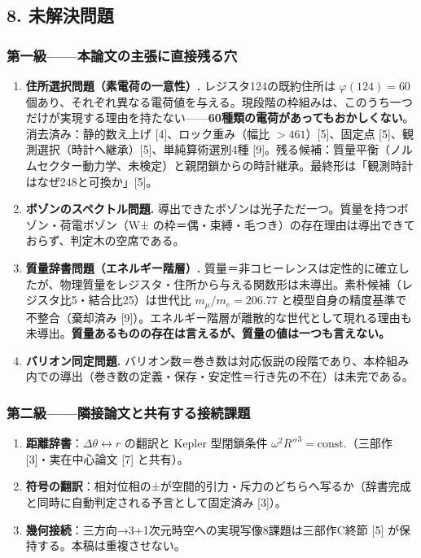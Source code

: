 \documentclass[
  a4paper,
]{ltjsarticle}
\providecommand{\tightlist}{%
  \setlength{\itemsep}{0pt}\setlength{\parskip}{0pt}}
\begin{document}
\subsection{8. 未解決問題}\label{ux672aux89e3ux6c7aux554fux984c}

\subsubsection{第一級------本論文の主張に直接残る穴}\label{ux7b2cux4e00ux7d1aux672cux8ad6ux6587ux306eux4e3bux5f35ux306bux76f4ux63a5ux6b8bux308bux7a74}

\begin{enumerate}
\def\labelenumi{\arabic{enumi}.}
\tightlist
\item
  \textbf{住所選択問題（素電荷の一意性）.} レジスタ124の既約住所は
  \(\varphi(124)=60\)
  個あり、それぞれ異なる電荷値を与える。現段階の枠組みは、このうち一つだけが実現する理由を持たない------\textbf{60種類の電荷があってもおかしくない}。消去済み：静的数え上げ
  {[}4{]}、ロック重み（幅比 \(>461\)）{[}5{]}、固定点
  {[}5{]}、観測選択（時計へ継承）{[}5{]}、単純算術選別4種
  {[}9{]}。残る候補：質量平衡（ノルムセクター動力学、未検定）と親閉鎖からの時計継承。最終形は「観測時計はなぜ248と可換か」{[}5{]}。
\item
  \textbf{ボゾンのスペクトル問題.}
  導出できたボゾンは光子ただ一つ。質量を持つボゾン・荷電ボゾン（W±
  の枠＝偶・束縛・毛つき）の存在理由は導出できておらず、判定木の空席である。
\item
  \textbf{質量辞書問題（エネルギー階層）.}
  質量＝非コヒーレンスは定性的に確立したが、物理質量をレジスタ・住所から与える関数形は未導出。素朴候補（レジスタ比5・結合比25）は世代比
  \(m_\mu/m_e=206.77\) と模型自身の精度基準で不整合（棄却済み
  {[}9{]}）。エネルギー階層が離散的な世代として現れる理由も未導出。\textbf{質量あるものの存在は言えるが、質量の値は一つも言えない。}
\item
  \textbf{バリオン同定問題.}
  バリオン数＝巻き数は対応仮説の段階であり、本枠組み内での導出（巻き数の定義・保存・安定性＝行き先の不在）は未完である。
\end{enumerate}

\subsubsection{第二級------隣接論文と共有する接続課題}\label{ux7b2cux4e8cux7d1aux96a3ux63a5ux8ad6ux6587ux3068ux5171ux6709ux3059ux308bux63a5ux7d9aux8ab2ux984c}

\begin{enumerate}
\def\labelenumi{\arabic{enumi}.}
\setcounter{enumi}{4}
\tightlist
\item
  \textbf{距離辞書}：\(\Delta\theta\leftrightarrow r\) の翻訳と Kepler
  型閉鎖条件 \(\omega^2R''^3=\text{const.}\)（三部作
  {[}3{]}・実在中心論文 {[}7{]} と共有）。
\item
  \textbf{符号の翻訳}：相対位相の±が空間的引力・斥力のどちらへ写るか（辞書完成と同時に自動判定される予言として固定済み
  {[}3{]}）。
\item
  \textbf{幾何接続}：三方向→3+1次元時空への実現写像8課題は三部作C終節
  {[}5{]} が保持する。本稿は重複させない。
\end{enumerate}
\end{document}
